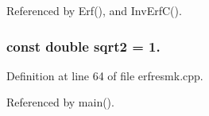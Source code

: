 Referenced by Erf(), and Inv\-Erf\-C().

\subsubsection[{sqrt2}]{\setlength{\rightskip}{0pt plus 5cm}const double sqrt2 = 1.\hspace{0.3cm}{\ttfamily [static]}}\label{rnd_2erfresmk_8cpp_a3e5855ac613bbea79256e42f7ba59a98}


Definition at line 64 of file erfresmk.\-cpp.



Referenced by main().

